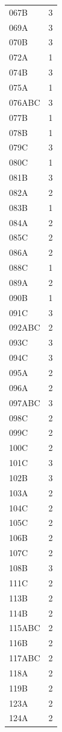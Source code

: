 \begin{longtable}{lr}
  067B & 3 \\
  069A & 3 \\
  070B & 3 \\
  072A & 1 \\
  074B & 3 \\
  075A & 1 \\
  076ABC & 3 \\
  077B & 1 \\
  078B & 1 \\
  079C & 3 \\
  080C & 1 \\
  081B & 3 \\
  082A & 2 \\
  083B & 1 \\
  084A & 2 \\
  085C & 2 \\
  086A & 2 \\
  088C & 1 \\
  089A & 2 \\
  090B & 1 \\
  091C & 3 \\
  092ABC & 2 \\
  093C & 3 \\
  094C & 3 \\
  095A & 2 \\
  096A & 2 \\
  097ABC & 3 \\
  098C & 2 \\
  099C & 2 \\
  100C & 2 \\
  101C & 3 \\
  102B & 3 \\
  103A & 2 \\
  104C & 2 \\
  105C & 2 \\
  106B & 2 \\
  107C & 2 \\
  108B & 3 \\
  111C  & 2 \\
  113B & 2 \\
  114B & 2 \\
  115ABC & 2 \\
  116B & 2 \\
  117ABC & 2 \\
  118A & 2 \\
  119B & 2 \\
  123A & 2 \\
  124A & 2 \\

\end{longtable}
